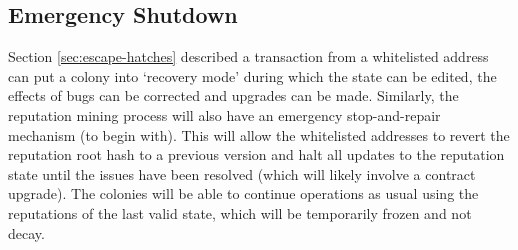 \subsection{Emergency Shutdown}\label{sec:big-red-button}
Section \ref{sec:escape-hatches} described a transaction from a whitelisted address can put a colony into `recovery mode' during which the state can be edited, the effects of bugs can be corrected and upgrades can be made. Similarly, the reputation mining process will also have an emergency stop-and-repair mechanism (to begin with). This will allow the whitelisted addresses to revert the reputation root hash to a previous version and halt all updates to the reputation state until the issues have been resolved (which will likely involve a contract upgrade). The colonies will be able to continue operations as usual using the reputations of the last valid state, which will be temporarily frozen and not decay.